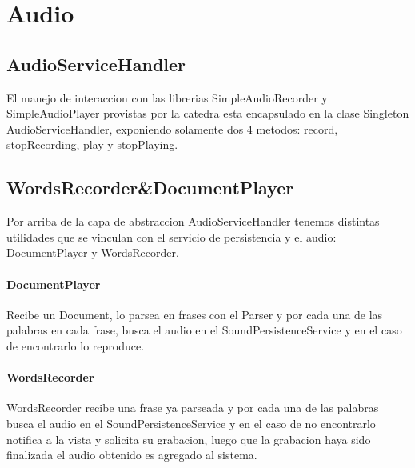 \section{Audio}
\subsection{AudioServiceHandler}
El manejo de interaccion con las librerias SimpleAudioRecorder y SimpleAudioPlayer provistas por la catedra esta encapsulado en la clase Singleton AudioServiceHandler, exponiendo solamente dos 4 metodos: record, stopRecording, play y stopPlaying.

\subsection{WordsRecorder&DocumentPlayer}
Por arriba de la capa de abstraccion AudioServiceHandler tenemos distintas utilidades que se vinculan con el servicio de persistencia y el audio: DocumentPlayer y WordsRecorder.

\paragraph{DocumentPlayer}
Recibe un Document, lo parsea en frases con el Parser y por cada una de las palabras en cada frase, busca el audio en el SoundPersistenceService y en el caso de encontrarlo lo reproduce.

\paragraph{WordsRecorder}
WordsRecorder recibe una frase ya parseada y por cada una de las palabras busca el audio en el SoundPersistenceService y en el caso de no encontrarlo notifica a la vista y solicita su grabacion, luego que la grabacion haya sido finalizada el audio obtenido es agregado al sistema.


